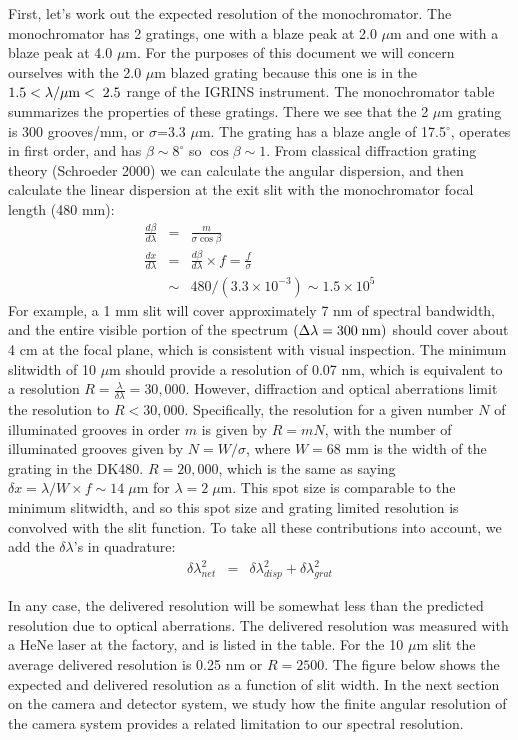 First, let's work out the expected resolution of the monochromator.  The monochromator has 2 gratings, one with a blaze peak at 2.0 $\mu$m and one with a blaze peak at 4.0 $\mu$m.  For the purposes of this document we will concern ourselves with the 2.0 $\mu$m blazed grating because this one is in the $1.5 < \lambda/\mu\rm{m} <\;2.5$ range of the IGRINS instrument.  The monochromator table summarizes the properties of these gratings.  There we see that the 2 $\mu$m grating is 300 grooves/mm, or $\sigma$=3.3 $\mu$m.  The grating has a blaze angle of 17.5$^\circ$, operates in first order, and has $\beta \sim 8^\circ$ so $\cos{\beta} \sim 1$.  From classical diffraction grating theory (Schroeder 2000) we can calculate the angular dispersion, and then calculate the linear dispersion at the exit slit with the monochromator focal length (480 mm):
\begin{eqnarray}
  \frac{d\beta}{d\lambda}&=& \frac{m}{\sigma \cos{\beta}}      \nonumber \\
  \frac{dx}{d\lambda}&=& \frac{d\beta}{d\lambda} \times f = \frac{f}{\sigma}  \nonumber\\
  	&\sim& 480 / (3.3 \times 10^{-3}) \sim 1.5 \times 10^{5}
\end{eqnarray}
For example, a 1 mm slit will cover approximately 7 nm of spectral bandwidth, and the entire visible portion of the spectrum $(\Delta \lambda = 300 \;\rm{nm})$ should cover about 4 cm at the focal plane, which is consistent with visual inspection.  The minimum slitwidth of 10 $\mu$m should provide a resolution of 0.07 nm, which is equivalent to a resolution $R=\frac{\lambda}{\delta \lambda}=30,000$.  However, diffraction and optical aberrations limit the resolution to $R<30,000$.  Specifically, the resolution for a given number $N$ of illuminated grooves in order $m$ is given by $R=mN$, with the number of illuminated grooves given by $N=W/\sigma$, where $W=68$ mm is the width of the grating in the DK480.  $R=20,000$, which is the same as saying $\delta x = \lambda/W \times f \sim 14\;\mu$m for $\lambda=2\;\mu$m.  This spot size is comparable to the minimum slitwidth, and so this spot size and grating limited resolution is convolved with the slit function.  To take all these contributions into account, we add the $\delta \lambda$'s in quadrature:
\begin{eqnarray}
	 \delta \lambda_{net}^2 &=& \delta \lambda_{disp}^2 + \delta \lambda_{grat}^2
\end{eqnarray}

In any case, the delivered resolution will be somewhat less than the predicted resolution due to optical aberrations.  The delivered resolution was measured with a HeNe laser at the factory, and is listed in the table.  For the 10 $\mu$m slit the average delivered resolution is 0.25 nm or $R=2500$.  The figure below shows the expected and delivered resolution as a function of slit width.  In the next section on the camera and detector system, we study how the finite angular resolution of the camera system provides a related limitation to our spectral resolution.


